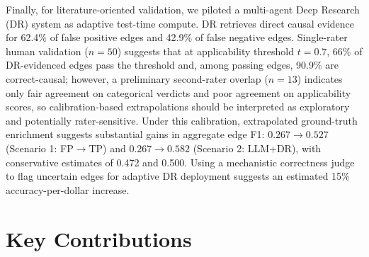 Finally, for literature-oriented validation, we piloted a multi-agent Deep Research (DR) system as adaptive test-time compute. DR retrieves direct causal evidence for 62.4\% of false positive edges and 42.9\% of false negative edges. Single-rater human validation (\(n=50\)) suggests that at applicability threshold \(t=0.7\), 66\% of DR-evidenced edges pass the threshold and, among passing edges, 90.9\% are correct-causal; however, a preliminary second-rater overlap (\(n=13\)) indicates only fair agreement on categorical verdicts and poor agreement on applicability scores, so calibration-based extrapolations should be interpreted as exploratory and potentially rater-sensitive. Under this calibration, extrapolated ground-truth enrichment suggests substantial gains in aggregate edge F1: \(0.267 \to 0.527\) (Scenario 1: FP\(\to\)TP) and \(0.267 \to 0.582\) (Scenario 2: LLM+DR), with conservative estimates of 0.472 and 0.500. Using a mechanistic correctness judge to flag uncertain edges for adaptive DR deployment suggests an estimated 15\% accuracy-per-dollar increase.

\section{Key Contributions}
\label{sec:conclusion_contributions}

